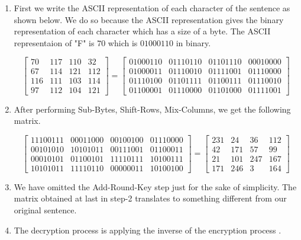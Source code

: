 \begin{enumerate}
\item First we write the ASCII representation of each character of the sentence as shown below. We do so because the ASCII representation gives the binary representation of each character which has a size of a byte. The ASCII representaion of "F" is \(70\) which is \(01000110\) in binary.\vspace{2mm}

  \[\begin{bmatrix}
      70 & 117 & 110 & 32 \\
      67 & 114 & 121 & 112\\
      116 & 111 & 103 & 114 \\
      97 & 112 & 104 & 121
    \end{bmatrix}=
    \begin{bmatrix}
      01000110 & 01110110 & 01101110 & 00010000 \\
      01000011 & 01110010 & 01111001 & 01110000\\
      01110100 & 01101111 & 01100111 & 01110010 \\
      01100001 & 01110000 & 01101000 & 01111001
    \end{bmatrix}
  \]

  \vspace{5mm}

\item After performing Sub-Bytes, Shift-Rows, Mix-Columns, we get the following matrix. \vspace{2mm}

  \[\begin{bmatrix}
      11100111 & 00011000 & 00100100 & 01110000\\
      00101010 & 10101011 & 00111001 & 01100011\\
      00010101 & 01100101 & 11110111 & 10100111\\
      10101011 & 11110110 & 00000011 & 10100100
    \end{bmatrix}=
    \begin{bmatrix}
      231 & 24 & 36 & 112\\
      42 & 171 & 57 & 99\\
      21 & 101 & 247 & 167\\
      171 & 246 & 3 & 164
    \end{bmatrix}
  \]
  \vspace{5mm}

\item We have omitted the Add-Round-Key step just for the sake of simplicity. The matrix obtained at last in step-2 translates to something different from our original sentence.

  \vspace{5mm}

\item The decryption process is applying the inverse of the encryption process \cite{aes}.
\end{enumerate}
